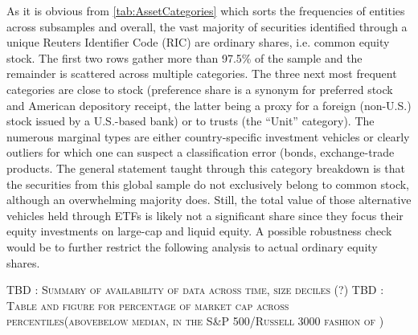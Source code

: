 As it is obvious from \autoref{tab:AssetCategories} which sorts the frequencies of entities across subsamples and overall, the vast majority of securities identified through a unique Reuters Identifier Code (RIC) are ordinary shares, i.e. common equity stock. The first two rows gather more than 97.5\% of the sample and the remainder is scattered across multiple categories. The three next most frequent categories are close to stock (preference share is a synonym for preferred stock and American depository receipt, the latter being a proxy for a foreign (non-U.S.) stock issued by a U.S.-based bank) or to trusts (the ``Unit'' category). The numerous marginal types are either country-specific investment vehicles or clearly outliers for which one can suspect a classification error (bonds, exchange-trade products. The general statement taught through this category breakdown is that the securities from this global sample do not exclusively belong to common stock, although an overwhelming majority does. Still, the total value of those alternative vehicles held through ETFs is likely not a significant share since they focus their equity investments on large-cap and liquid equity. A possible robustness check would be to further restrict the following analysis to actual ordinary equity shares. 
\begin{center}
  \textsc{TBD : Summary of availability of data across time, size deciles (?)}
  \textsc{TBD : Table and figure for percentage of market cap across percentiles(above\/below median, in the S\&P 500/Russell 3000 fashion of \textcite{Ben-David2018})}
\end{center}


